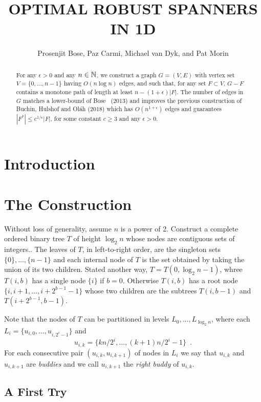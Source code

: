 \documentclass{patmorin}
\title{\MakeUppercase{Optimal Robust Spanners in 1D}}
\author{Prosenjit Bose, Paz Carmi, Michael van Dyk, and Pat Morin}
\begin{document}
\maketitle


\begin{abstract}
  For any $\epsilon >0$ and any $n\in\mathbb{N}$, we construct a graph $G=(V,E)$
  with vertex set $V=\{0,\ldots,n-1\}$ having $O(n\log n)$ edges, and such
  that, for any set $F\subset V$, $G-F$ contains a monotone
  path of length at least $n-(1+\epsilon)|F|$.  The number of edges
  in $G$ matches a lower-bound of Bose \etal\ (2013) and improves the
  previous construction of Buchin, Hulshof and Ol\'ah (2018) which has
  $O(n^{1+\epsilon})$ edges and guarantees $|F^*|\le c^{1/\epsilon}|F|$,
  for some constant $c\ge 3$ and any $\epsilon >0$.
\end{abstract}

\section{Introduction}

\section{The Construction}


Without loss of generality, assume $n$ is a power of 2.  Construct a
complete ordered binary tree $T$ of height $\log_2 n$ whose nodes are
contiguous sets of integers..  The leaves of $T$, in left-to-right order,
are the singleton sets $\{0\},\ldots,\{n-1\}$ and each internal node of
$T$ is the set obtained by taking the union of its two children.  Stated
another way, $T=T(0,\log_2 n-1)$, whree $T(i,b)$ has a single node $\{i\}$
if $b=0$. Otherwise $T(i,b)$ has a root node $\{i,i+1,\ldots,i+2^{b-1}-1\}$
whose two children are the subtrees $T(i,b-1)$ and $T(i+2^{b-1}, b-1)$.

Note that the nodes of $T$ can be partitioned in levels $L_0,\ldots,L_{\log_2 n}$, where each $L_i=\{u_{i,0},\ldots,u_{i,2^i-1}\}$ and
\[
	u_{i,k} = \{kn/2^i,\ldots,(k+1)n/2^{i}-1\} \enspace .
\]
For each consecutive pair $(u_{i,k},u_{i,k+1})$ of nodes in $L_i$ we say
that $u_{i,k}$ and $u_{i,k+1}$ are \emph{buddies} and we call $u_{i,k+1}$
the \emph{right buddy} of $u_{i,k}$.

\subsection{A First Try}
\end{document}
